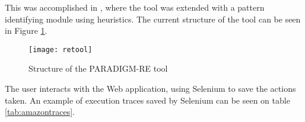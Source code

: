 This was accomplished in \cite{nabuco2014inferring}, where the tool was extended with a pattern identifying module using heuristics. The current structure of the tool can be seen in Figure \ref{fig:retool}. 

\begin{figure}[htb]
  \begin{center}
    \leavevmode
    \texttt{[image: retool]}
  	\caption[Structure of the PARADIGM-RE tool]{Structure of the PARADIGM-RE tool \cite{nabuco2014inferring}}
  	\label{fig:retool}
   \end{center}
\end{figure}

The user interacts with the Web application, using Selenium to save the actions taken.  An example of execution traces saved by Selenium can be seen on table \ref{tab:amazontraces}. 

